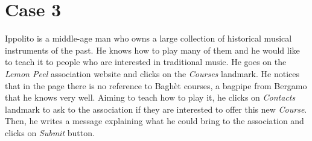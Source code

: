 \documentclass[../../DD.tex]{subfiles}
\begin{document}
\section{Case 3 \label{sect:4.3}}

	Ippolito is a middle-age man who owns a large collection of historical musical instruments of the past. He knows how to play many of them and he would like to teach it to people who are interested in traditional music.
	\newline He goes on the \textit{Lemon Peel} association website and clicks on the \textit{Courses} landmark. He notices that in the page there is no reference to Baghèt courses, a bagpipe from Bergamo that he knows very well. Aiming to teach how to play it, he clicks on \textit{Contacts} landmark to ask to the association if they are interested to offer this new \textit{Course}. Then, he writes a message explaining what he could bring to the association and clicks on \textit{Submit} button.
	
\end{document}
